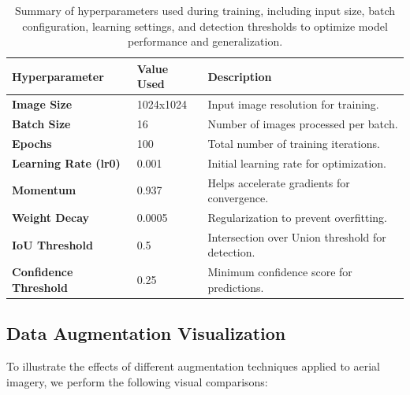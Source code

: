 \documentclass[preprint,review,12pt]{elsarticle}
\begin{document}
\begin{table}[h]
    \centering
    \footnotesize{
        \begin{tabular}{|p{3.1cm}|p{2.3cm}|p{5.2cm}|}
            \hline
            \textbf{Hyperparameter} & \textbf{Value Used} & \textbf{Description} \\
            \hline
            \textbf{Image Size} & 1024x1024 & Input image resolution for training. \\
            \textbf{Batch Size} & 16 & Number of images processed per batch. \\
            \textbf{Epochs} & 100 & Total number of training iterations. \\
            \textbf{Learning Rate (lr0)} & 0.001 & Initial learning rate for optimization. \\
            \textbf{Momentum} & 0.937 & Helps accelerate gradients for convergence. \\
            \textbf{Weight Decay} & 0.0005 & Regularization to prevent overfitting. \\
            \textbf{IoU Threshold} & 0.5 & Intersection over Union threshold for detection. \\
            \textbf{Confidence Threshold} & 0.25 & Minimum confidence score for predictions. \\
            \hline
        \end{tabular}
    }
    \caption{ Summary of hyperparameters used during training, including input size, batch configuration, learning settings, and detection thresholds to optimize model performance and generalization.}
    \label{tab:hyperparams}
\end{table}
\subsection{Data Augmentation Visualization}

To illustrate the effects of different augmentation techniques applied to aerial imagery, we perform the following visual comparisons:
\end{document}

